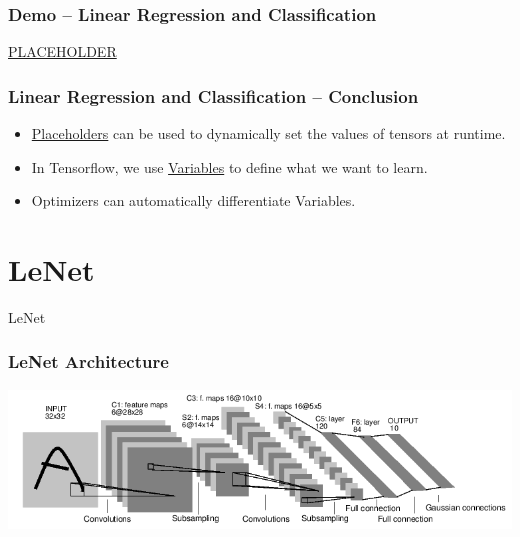 \documentclass{beamer}
\begin{document}
\begin{frame}
  \frametitle{Demo -- Linear Regression and Classification}
  \Huge{\centerline{\href{PLACEHOLDER}{PLACEHOLDER}}}
\end{frame}

\begin{frame}
  \frametitle{Linear Regression and Classification -- Conclusion}
  \begin{itemize}
  \item \underline{Placeholders} can be used to dynamically set the values of tensors at runtime.
  \item In Tensorflow, we use \underline{Variables} to define what we want to learn.
  \item Optimizers can automatically differentiate Variables.
  \end{itemize}
\end{frame}

\section{LeNet}
\begin{frame}
  \huge{\centerline{LeNet}}
\end{frame}

\begin{frame}
  \frametitle{LeNet Architecture}
  \begin{center}
    \includegraphics[width=1.0\linewidth]{LeNet.png}
  \end{center}
\end{frame}
\end{document}
